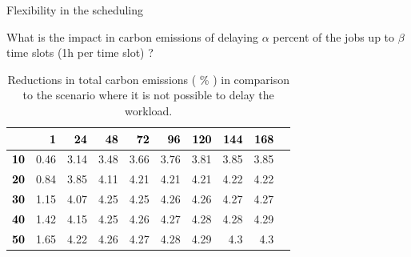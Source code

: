 \documentclass[Ligatures=TeX,table,svgnames,usetotalslideindicator,compress,10pt]{beamer}
\begin{document}
\begin{frame}{Flexibility in the scheduling}
  
  What is the impact in carbon emissions of delaying $\alpha$ percent of the jobs up to $\beta$ time slots (1h per time slot) ?
  \pause

  \begin{table}[h]
\caption{Reductions in total carbon emissions ( \% ) in comparison to the scenario where it is not possible to delay the workload. }\centering
\label{tab:flex_scheduling}
\begin{tabular}{|l|r|r|r|r|r|r|r|r|r|}
  \hline
  \small
\backslashbox{$\alpha$}{$\beta$} &   \textcolor{black}{\textbf{ 1}} &  \textcolor{black}{\textbf{ 24 }} &  \textcolor{black}{\textbf{ 48 }}  &   \textcolor{black}{\textbf{ 72 }} &   \textcolor{black}{\textbf{ 96 }} &   \textcolor{black}{\textbf{ 120  }} &   \textcolor{black}{\textbf{ 144 }} &   \textcolor{black}{\textbf{ 168 }} \\ 
     \hline
 \textcolor{black}{ \textbf{10}}   &  0.46  &  3.14 &  3.48 &  3.66 &  3.76 &  3.81 &  3.85 &  3.85 \\ 
\hline
 \textcolor{black}{ \textbf{20}}   &  0.84  &  3.85 &  4.11 &  4.21 &  4.21 &  4.21 &  4.22 &  4.22 \\ 
\hline
 \textcolor{black}{ \textbf{30}}   &  1.15  &  4.07 &  4.25 &  4.25 &  4.26 &  4.26 &  4.27 &  4.27 \\ 
\hline
 \textcolor{black}{ \textbf{40}}   &  1.42  &  4.15 &  4.25 &  4.26 &  4.27 &  4.28 &  4.28 &  4.29 \\ 
\hline
 \textcolor{black}{ \textbf{50}}   &  1.65  &  4.22 &  4.26 &  4.27 &  4.28 &  4.29 &  4.3 &  4.3 \\ 
\hline
\end{tabular}
\end{table}

\end{frame}
\end{document}
